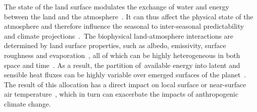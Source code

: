\documentclass[gmd, manuscript]{copernicus}
\begin{document}
The state of the land surface modulates the exchange of water and energy
between the land and the atmosphere~\citep{Seneviratne_2010}. It can thus
affect the physical state of the atmosphere and therefore influence the
seasonal to inter-seasonal predictability and climate
projections~\citep{Koster_2004}.~The biophysical land-atmosphere
interactions are determined by land surface properties, such as albedo,
emissivity, surface roughness and evaporation~\citep{anderson2012climate}, all of
which can be highly heterogeneous in both space and
time~\citep{santanello2018land}. As a result, the partition of~available energy
into latent and sensible heat fluxes can be highly variable over emerged
surfaces of the planet~\citep{dickinson1995land}. The result of this allocation
has a direct impact on local surface or near-surface air
temperature~\citep{pielke2002influence}, which in turn can exacerbate the impacts
of anthropogenic climate change.~
\end{document}
